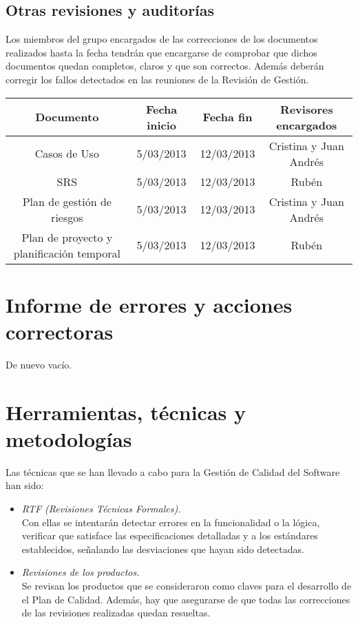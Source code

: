\documentclass[11pt, a4paper, twoside, titlepage]{article}
\begin{document}
			
		\subsection{Otras revisiones y auditorías}
		Los miembros del grupo encargados de las correcciones de los documentos realizados hasta la fecha tendrán que encargarse 	de comprobar que dichos documentos quedan completos, claros y que son correctos. Además deberán corregir los fallos detectados en las reuniones de la Revisión de Gestión. \\
		
			\begin{center}
			\begin{tabular}{| c | c | c | c |}
				\hline
				\bfseries Documento 	& \bfseries Fecha inicio & \bfseries Fecha fin & \bfseries Revisores encargados	\\ \hline
				Casos de Uso		& 5/03/2013	& 12/03/2013	& Cristina y Juan Andrés	\\ \hline
				SRS 			& 5/03/2013 	& 12/03/2013 	& Rubén				\\ \hline
				Plan de gestión de riesgos & 5/03/2013	& 12/03/2013 	& Cristina y Juan Andrés	\\ \hline
				Plan de proyecto y planificación temporal & 5/03/2013 	& 12/03/2013 & Rubén		\\ \hline
			\end{tabular}
			\end{center}
		
	\section{Informe de errores y acciones correctoras} %
		De nuevo vacío.
	
	\section{Herramientas, técnicas y metodologías} %
		Las técnicas que se han llevado a cabo para la Gestión de Calidad del Software han sido:
          		  \begin{itemize}
               		 \item \textsl{RTF (Revisiones Técnicas Formales).} \\
               			Con ellas se intentarán detectar errores en la funcionalidad o la lógica, verificar que satisface las especificaciones detalladas y a los estándares establecidos, señalando las desviaciones que hayan sido detectadas.
            	 	\item \textsl{Revisiones de los productos.} \\
             			Se revisan los productos que se consideraron como claves para el desarrollo de el Plan de Calidad. Además, hay que asegurarse de que todas las correcciones de las revisiones realizadas quedan resueltas.
         		   \end{itemize}
\end{document}
